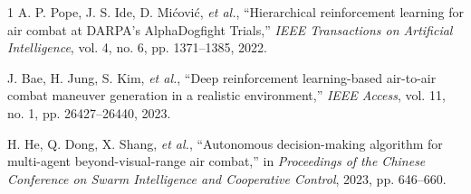 \documentclass[letterpaper, 10 pt, conference]{ieeeconf}
\begin{document}
\begin{thebibliography}{1}
    A. P. Pope, J. S. Ide, D. Mićović, \textit{et al.}, ``Hierarchical reinforcement learning for air combat at {DARPA}'s {AlphaDogfight Trials},'' \emph{IEEE Transactions on Artificial Intelligence}, vol. 4, no. 6, pp. 1371--1385, 2022.
    
    J. Bae, H. Jung, S. Kim, \textit{et al.}, ``Deep reinforcement learning-based air-to-air combat maneuver generation in a realistic environment,'' \emph{IEEE Access}, vol. 11, no. 1, pp. 26427--26440, 2023.

    H. He, Q. Dong, X. Shang, \textit{et al.}, ``Autonomous decision-making algorithm for multi-agent beyond-visual-range air combat,'' in \emph{Proceedings of the Chinese Conference on Swarm Intelligence and Cooperative Control}, 2023, pp. 646--660.

\end{thebibliography}

% 
\end{document}
